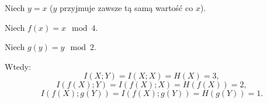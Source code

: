 Niech $y = x$ ($y$ przyjmuje zawsze tą samą wartość co $x$).

Niech $f(x) = x \mod 4$.

Niech $g(y) = y \mod 2$.

Wtedy:
$$
I(X; Y) = I(X; X) = H(X) = 3,
$$
$$
I(f(X); Y) = I(f(X); X) = H(f(X)) = 2,
$$
$$
I(f(X); g(Y)) = I(f(X); g(Y)) = H(g(Y)) = 1.
$$



